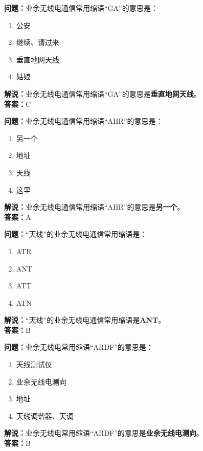 \bigskip


\noindent\textbf{问题：}业余无线电通信常用缩语“GA”的意思是：
\begin{enumerate}[label=\Alph*), leftmargin=3em]
\item 公安
\item 继续、请过来
\item 垂直地网天线
\item 姑娘
\end{enumerate}
\noindent\textbf{解说：}业余无线电通信常用缩语“GA”的意思是\textbf{垂直地网天线}。\\\noindent\textbf{答案：}C



\bigskip


\noindent\textbf{问题：}业余无线电通信常用缩语“AHR”的意思是：
\begin{enumerate}[label=\Alph*), leftmargin=3em]
\item 另一个
\item 地址
\item 天线
\item 这里
\end{enumerate}
\noindent\textbf{解说：}业余无线电通信常用缩语“AHR”的意思是\textbf{另一个}。\\\noindent\textbf{答案：}A

\bigskip


\noindent\textbf{问题：}“天线”的业余无线电通信常用缩语是：
\begin{enumerate}[label=\Alph*), leftmargin=3em]
\item ATR
\item ANT
\item ATT
\item ATN
\end{enumerate}
\noindent\textbf{解说：}“天线”的业余无线电通信常用缩语是\textbf{ANT}。\\\noindent\textbf{答案：}B



\bigskip


\noindent\textbf{问题：}业余无线电常用缩语“ARDF”的意思是：
\begin{enumerate}[label=\Alph*), leftmargin=3em]
\item 天线测试仪
\item 业余无线电测向
\item 地址
\item 天线调谐器、天调
\end{enumerate}
\noindent\textbf{解说：}业余无线电常用缩语“ARDF”的意思是\textbf{业余无线电测向}。\\\noindent\textbf{答案：}B



